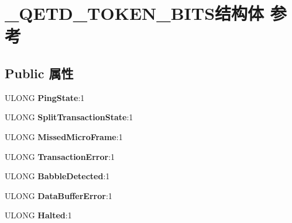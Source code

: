 \hypertarget{struct___q_e_t_d___t_o_k_e_n___b_i_t_s}{}\section{\+\_\+\+Q\+E\+T\+D\+\_\+\+T\+O\+K\+E\+N\+\_\+\+B\+I\+T\+S结构体 参考}
\label{struct___q_e_t_d___t_o_k_e_n___b_i_t_s}
\subsection*{Public 属性}
\begin{DoxyCompactItemize}
\item 
\mbox{\label{struct___q_e_t_d___t_o_k_e_n___b_i_t_s_afc2c6102cac76db791cc41fccf14b8e0}} 
U\+L\+O\+NG {\bfseries Ping\+State}\+:1
\item 
\mbox{\label{struct___q_e_t_d___t_o_k_e_n___b_i_t_s_ad8a52dcb40156af48ed56e85cb8a45b6}} 
U\+L\+O\+NG {\bfseries Split\+Transaction\+State}\+:1
\item 
\mbox{\label{struct___q_e_t_d___t_o_k_e_n___b_i_t_s_a2f23fa225c5a7e1d21899d4a828c8672}} 
U\+L\+O\+NG {\bfseries Missed\+Micro\+Frame}\+:1
\item 
\mbox{\label{struct___q_e_t_d___t_o_k_e_n___b_i_t_s_ae1b7767f3c6eddbe5d68957b3246bd70}} 
U\+L\+O\+NG {\bfseries Transaction\+Error}\+:1
\item 
\mbox{\label{struct___q_e_t_d___t_o_k_e_n___b_i_t_s_a3cbc7b1a38caae5440586cf7c94ff3a2}} 
U\+L\+O\+NG {\bfseries Babble\+Detected}\+:1
\item 
\mbox{\label{struct___q_e_t_d___t_o_k_e_n___b_i_t_s_ab1e3d13a8e7731a7c7a7d0ec62287161}} 
U\+L\+O\+NG {\bfseries Data\+Buffer\+Error}\+:1
\item 
\mbox{\label{struct___q_e_t_d___t_o_k_e_n___b_i_t_s_abae20950431933a9881f715966df2e39}} 
U\+L\+O\+NG {\bfseries Halted}\+:1
\item 

\end{DoxyCompactItemize}
